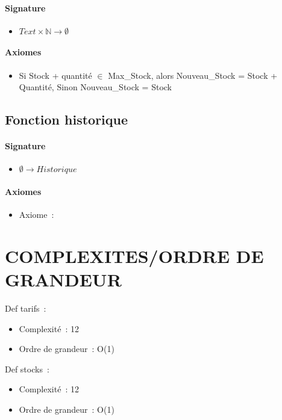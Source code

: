 \documentclass[]{article}
\begin{document}
\paragraph{Signature}
\begin{itemize}
\item
  $  Text \times \mathbb{N} \longrightarrow \emptyset$
\end{itemize}
\paragraph{Axiomes}
\begin{itemize}
\item
 Si Stock + quantité \(\in \) Max\_Stock, alors Nouveau\_Stock =
  Stock + Quantité,
Sinon Nouveau\_Stock = Stock
\end{itemize}

\subsection*{Fonction historique}
\paragraph{Signature}
\begin{itemize}
\item
  $  \emptyset \longrightarrow Historique$
\end{itemize}
\paragraph{Axiomes}
\begin{itemize}
\item
  Axiome~:
\end{itemize}
\pagebreak
\section*{COMPLEXITES/ORDRE DE GRANDEUR}

Def tarifs~:

\begin{itemize}
\item
  Complexité~: 12
\item
  Ordre de grandeur~: O(1)
\end{itemize}

Def stocks~:

\begin{itemize}
\item
  Complexité~: 12
\item
  Ordre de grandeur~: O(1)
\end{itemize}
\end{document}
